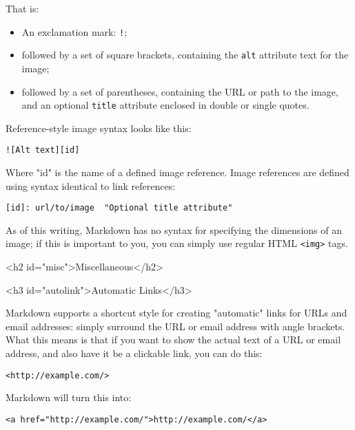 That is:

\begin{itemize}
\item An exclamation mark: \texttt{!};
\item followed by a set of square brackets, containing the \texttt{alt}
attribute text for the image;
\item followed by a set of parentheses, containing the URL or path to
the image, and an optional \texttt{title} attribute enclosed in double
or single quotes.
\end{itemize}




Reference-style image syntax looks like this:

\begin{lstlisting}
![Alt text][id]
\end{lstlisting}




Where "id" is the name of a defined image reference. Image references
are defined using syntax identical to link references:

\begin{lstlisting}
[id]: url/to/image  "Optional title attribute"
\end{lstlisting}




As of this writing, Markdown has no syntax for specifying the
dimensions of an image; if this is important to you, you can simply
use regular HTML \texttt{<img>} tags.

\noindent\makebox[\linewidth]{\rule{\linewidth}{0.4pt}}\medskip


<h2 id="misc">Miscellaneous</h2>

<h3 id="autolink">Automatic Links</h3>



Markdown supports a shortcut style for creating "automatic" links for URLs and email addresses: simply surround the URL or email address with angle brackets. What this means is that if you want to show the actual text of a URL or email address, and also have it be a clickable link, you can do this:

\begin{lstlisting}
<http://example.com/>
\end{lstlisting}




Markdown will turn this into:

\begin{lstlisting}
<a href="http://example.com/">http://example.com/</a>
\end{lstlisting}




